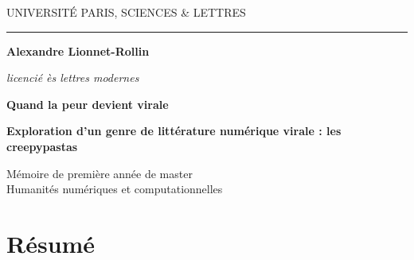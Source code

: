 \documentclass[12pt,a4paper,oneside,titlepage]{book} %
\begin{document}
\frontmatter
\begin{titlepage}
	\begin{center}
		
		\bigskip
		
		\begin{large}
			UNIVERSITÉ PARIS, SCIENCES \& LETTRES
		\end{large}
		\begin{center}\rule{2cm}{0.02cm}\end{center}
		
		\bigskip
		\bigskip
		\bigskip
		\begin{Large}
			\textbf{Alexandre Lionnet-Rollin}\\
		\end{Large}
		\begin{normalsize} \textit{licencié ès lettres modernes}\\
			
		\end{normalsize}
		
		\bigskip
		\bigskip
		\bigskip
		
		\begin{Huge}
			\textbf{Quand la peur devient virale}\\
		\end{Huge}
		\bigskip
		\bigskip
		\begin{LARGE}
		\textbf{Exploration d'un genre de littérature numérique virale : les creepypastas}\\
		\end{LARGE}
		
		\bigskip
		\bigskip
		\bigskip
		\begin{large}
		\end{large}
		\vfill
		
		\begin{large}
			Mémoire de première année de master\\
			\og Humanités numériques et computationnelles \fg{} \\
		\end{large}
		
	\end{center}
\end{titlepage}

\thispagestyle{empty}

\cleardoublepage

\section*{Résumé}
\end{document}
